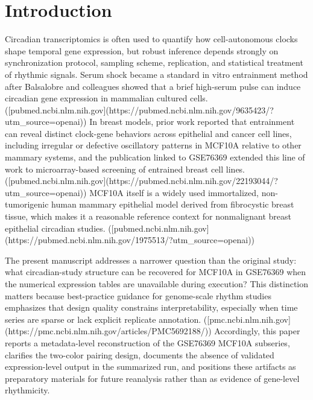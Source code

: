 \documentclass[11pt]{article}
\begin{document}
\section{Introduction}
Circadian transcriptomics is often used to quantify how cell-autonomous clocks shape temporal gene expression, but robust inference depends strongly on synchronization protocol, sampling scheme, replication, and statistical treatment of rhythmic signals. Serum shock became a standard in vitro entrainment method after Balsalobre and colleagues showed that a brief high-serum pulse can induce circadian gene expression in mammalian cultured cells. ([pubmed.ncbi.nlm.nih.gov](https://pubmed.ncbi.nlm.nih.gov/9635423/?utm\_source=openai)) In breast models, prior work reported that entrainment can reveal distinct clock-gene behaviors across epithelial and cancer cell lines, including irregular or defective oscillatory patterns in MCF10A relative to other mammary systems, and the publication linked to GSE76369 extended this line of work to microarray-based screening of entrained breast cell lines. ([pubmed.ncbi.nlm.nih.gov](https://pubmed.ncbi.nlm.nih.gov/22193044/?utm\_source=openai)) MCF10A itself is a widely used immortalized, non-tumorigenic human mammary epithelial model derived from fibrocystic breast tissue, which makes it a reasonable reference context for nonmalignant breast epithelial circadian studies. ([pubmed.ncbi.nlm.nih.gov](https://pubmed.ncbi.nlm.nih.gov/1975513/?utm\_source=openai))

The present manuscript addresses a narrower question than the original study: what circadian-study structure can be recovered for MCF10A in GSE76369 when the numerical expression tables are unavailable during execution? This distinction matters because best-practice guidance for genome-scale rhythm studies emphasizes that design quality constrains interpretability, especially when time series are sparse or lack explicit replicate annotation. ([pmc.ncbi.nlm.nih.gov](https://pmc.ncbi.nlm.nih.gov/articles/PMC5692188/)) Accordingly, this paper reports a metadata-level reconstruction of the GSE76369 MCF10A subseries, clarifies the two-color pairing design, documents the absence of validated expression-level output in the summarized run, and positions these artifacts as preparatory materials for future reanalysis rather than as evidence of gene-level rhythmicity.
\end{document}
